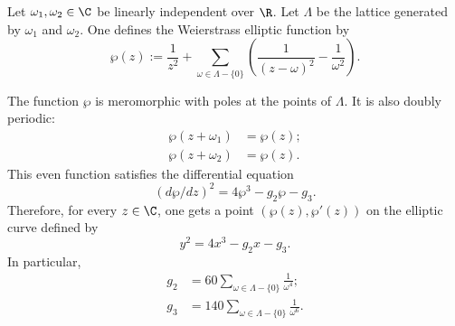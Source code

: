 \documentclass [preview, border = 20pt] {standalone}
\begin{document}
\pagecolor{black}
\color{white}
Let $\omega_1,\omega_2\in \C$ be linearly independent over $\R$. Let $\Lambda$ be the lattice generated by $\omega_1$ and $\omega_2$. One defines the Weierstrass elliptic function by
\[
 \wp(z) := \frac{1}{z^2} + \sum_{\omega\in \Lambda-\{0\}} \left( \frac{1}{(z-\omega)^2} - \frac{1}{\omega^2}\right).
\]

The function $\wp$ is meromorphic with poles at the points of $\Lambda$. It is also doubly periodic:
\begin{align*}
\wp(z+\omega_1) &= \wp(z);\\
\wp(z+\omega_2) &= \wp(z).
\end{align*}
This even function satisfies the differential equation
\[
(d\wp/dz)^2 = 4\wp^3 -g_2\wp - g_3.
\]
Therefore, for every $z\in \C$, one gets a point $(\wp(z),\wp'(z))$ on the elliptic curve defined by
\[
 y^2 = 4x^3-g_2x-g_3.
\]
In particular,
\begin{align*}
g_2 &= 60 \sum_{\omega\in \Lambda-\{0\}} \frac{1}{\omega^4};\\
g_3 &= 140 \sum_{\omega\in \Lambda-\{0\}} \frac{1}{\omega^6}.
\end{align*}
\end{document}
